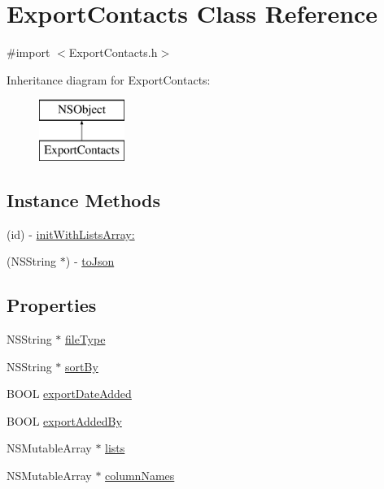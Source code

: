 \hypertarget{interface_export_contacts}{\section{Export\-Contacts Class Reference}
\label{interface_export_contacts}
}


{\ttfamily \#import $<$Export\-Contacts.\-h$>$}

Inheritance diagram for Export\-Contacts\-:\begin{figure}[H]
\begin{center}
\leavevmode
\includegraphics[height=2.000000cm]{interface_export_contacts}
\end{center}
\end{figure}
\subsection*{Instance Methods}
\begin{DoxyCompactItemize}
\item 
(id) -\/ \hyperlink{interface_export_contacts_aa635873d4d33f6530c065343d01e4faf}{init\-With\-Lists\-Array\-:}
\item 
(N\-S\-String $\ast$) -\/ \hyperlink{interface_export_contacts_a7c6d549662f605d1e8cd5ce8cc0e0b80}{to\-Json}
\end{DoxyCompactItemize}
\subsection*{Properties}
\begin{DoxyCompactItemize}
\item 
N\-S\-String $\ast$ \hyperlink{interface_export_contacts_a2da21b833047ae9858e52fb23b57def2}{file\-Type}
\item 
N\-S\-String $\ast$ \hyperlink{interface_export_contacts_a0f38be8806e1582be9980cd84e446081}{sort\-By}
\item 
B\-O\-O\-L \hyperlink{interface_export_contacts_a60b823601cc667da2a7b35075bbe8016}{export\-Date\-Added}
\item 
B\-O\-O\-L \hyperlink{interface_export_contacts_a3e04d556f4e5a6e5b190eecd5ce2eab6}{export\-Added\-By}
\item 
N\-S\-Mutable\-Array $\ast$ \hyperlink{interface_export_contacts_a911744dfb12c60e9bb176a6b71fea829}{lists}
\item 
N\-S\-Mutable\-Array $\ast$ \hyperlink{interface_export_contacts_a6aab87a3e3a705741cf069f82b6d6dc5}{column\-Names}
\end{DoxyCompactItemize}


